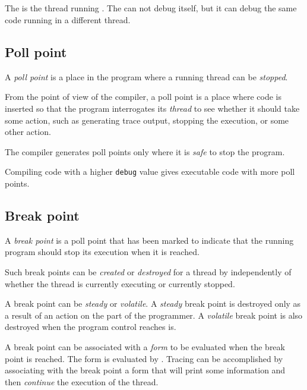 \subsection{\Debuggerthread{}}

The \debuggerthread{} is the thread running \sysname{}.  The
\debuggerthread{} can not debug itself, but it can debug the same code
running in a different thread.

%
\def\Pollpoint{Poll point}%
\def\pollpoint{poll point}%
\def\pollpoints{poll points}%
\subsection{\Pollpoint{}}

A \emph{\pollpoint{}} is a place in the program where a running thread
can be \emph{stopped}.

From the point of view of the compiler, a \pollpoint{} is a place
where code is inserted so that the program interrogates its
\emph{thread} to see whether it should take some action, such as
generating trace output, stopping the execution, or some other
action.  

The compiler generates \pollpoints{} only where it is \emph{safe} to
stop the program.

Compiling code with a higher \texttt{debug} value gives executable
code with more \pollpoints{}.

%
\def\Breakpoint{Break point}%
\def\breakpoint{break point}%
\def\breakpoints{break points}%
\subsection{\Breakpoint{}}

A \emph{\breakpoint{}} is a \pollpoint{} that has been marked to indicate
that the running program should stop its execution when it is
reached.

Such \breakpoints{} can be \emph{created} or \emph{destroyed} for a
thread by \sysname{} independently of whether the thread is currently
executing or currently stopped.

A \breakpoint{} can be \emph{steady} or \emph{volatile}.  A
\emph{steady} \breakpoint{} is destroyed only as a result of an action
on the part of the programmer.  A \emph{volatile} \breakpoint{} is
also destroyed when the program control reaches is.

A \breakpoint{} can be associated with a \commonlisp{} \emph{form} to
be evaluated when the \breakpoint{} is reached.  The form is evaluated
by \sysname{}.  Tracing can be accomplished by associating with the
\breakpoint{} a form that will print some information and then
\emph{continue} the execution of the thread.


